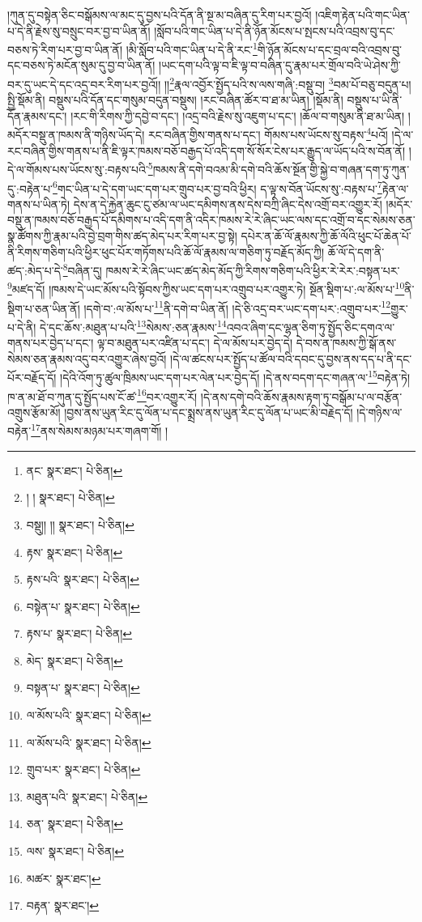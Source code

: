 །ཀུན་དུ་བསྟེན་ཅིང་བསྒོམས་ལ་མང་དུ་བྱས་པའི་དོན་ནི་སྔ་མ་བཞིན་དུ་རིག་པར་བྱའོ། །འཇིག་རྟེན་པའི་གང་ཡིན་པ་དེ་ནི་རྗེས་སུ་བསྲུང་བར་བྱ་བ་ཡིན་ནོ། །སློབ་པའི་གང་ཡིན་པ་དེ་ནི་ཉོན་མོངས་པ་སྤངས་པའི་འབྲས་བུ་དང་བཅས་ཏེ་རིག་པར་བྱ་བ་ཡིན་ནོ། །མི་སློབ་པའི་གང་ཡིན་པ་དེ་ནི་རང་\footnote{ནང་  སྣར་ཐང་།  པེ་ཅིན། }གི་ཉོན་མོངས་པ་དང་བྲལ་བའི་འབྲས་བུ་དང་བཅས་ཏེ་མངོན་སུམ་དུ་བྱ་བ་ཡིན་ནོ། །ཡང་དག་པའི་ལྟ་བ་ཇི་ལྟ་བ་བཞིན་དུ་རྣམ་པར་གྲོལ་བའི་ཡེ་ཤེས་ཀྱི་བར་དུ་ཡང་དེ་དང་འདྲ་བར་རིག་པར་བྱའོ།། །།\footnote{། །  སྣར་ཐང་།  པེ་ཅིན། }རྣལ་འབྱོར་སྤྱོད་པའི་ས་ལས་གཞི་:བསྡུ་བ། \footnote{བསྡུ།། །།   སྣར་ཐང་།  པེ་ཅིན། }བམ་པོ་བཅུ་བདུན་པ། སྤྱི་སྡོམ་ནི། བསྡུས་པའི་དོན་དང་གསུམ་བདུན་བསྡུས། །རང་བཞིན་ཚོར་བ་ཐ་མ་ཡིན། །སྡོམ་ནི། བསྡུས་པ་ཡི་ནི་དོན་རྣམས་དང་། །རང་གི་རིགས་ཀྱི་དབྱེ་བ་དང་། །འདྲ་བའི་རྗེས་སུ་འཇུག་པ་དང་། །ཆོལ་བ་གསུམ་ནི་ཐ་མ་ཡིན། །མདོར་བསྡུ་ན་ཁམས་ནི་གཉིས་ཡོད་དེ། རང་བཞིན་གྱིས་གནས་པ་དང་། གོམས་པས་ཡོངས་སུ་བརྟས་\footnote{རྟས་  སྣར་ཐང་།  པེ་ཅིན། }པའོ། །དེ་ལ་རང་བཞིན་གྱིས་གནས་པ་ནི་ཇི་ལྟར་ཁམས་བཅོ་བརྒྱད་པོ་འདི་དག་སོ་སོར་ངེས་པར་རྒྱུད་ལ་ཡོད་པའི་ས་བོན་ནོ། །དེ་ལ་གོམས་པས་ཡོངས་སུ་:བརྟས་པའི་\footnote{རྟས་པའི་  སྣར་ཐང་།  པེ་ཅིན། }ཁམས་ནི་དགེ་བའམ་མི་དགེ་བའི་ཆོས་སྔོན་གྱི་སྐྱེ་བ་གཞན་དག་ཏུ་ཀུན་དུ་:བརྟེན་པ་\footnote{བསྟེན་པ་  སྣར་ཐང་།  པེ་ཅིན། }གང་ཡིན་པ་དེ་དག་ཡང་དག་པར་གྲུབ་པར་བྱ་བའི་ཕྱིར། ད་ལྟ་ས་བོན་ཡོངས་སུ་:བརྟས་པ་\footnote{རྟས་པ་  སྣར་ཐང་།  པེ་ཅིན། }རྟེན་ལ་གནས་པ་ཡིན་ཏེ། དེས་ན་དེ་རྐྱེན་ཆུང་ངུ་ཙམ་ལ་ཡང་དམིགས་ནས་དེས་བཀྲི་ཞིང་དེས་འགྲོ་བར་འགྱུར་རོ། །མདོར་བསྡུ་ན་ཁམས་བཅོ་བརྒྱད་པོ་དམིགས་པ་འདི་དག་ནི་འདིར་ཁམས་རེ་རེ་ཞིང་ཡང་ལས་དང་འགྲོ་བ་དང་སེམས་ཅན་སྣ་ཚོགས་ཀྱི་རྣམ་པའི་བྱེ་བྲག་གིས་ཚད་མེད་པར་རིག་པར་བྱ་སྟེ། དཔེར་ན་ཆོ་ལོ་རྣམས་ཀྱི་ཆོ་ལོའི་ཕུང་པོ་ཆེན་པོ་ནི་རིགས་གཅིག་པའི་ཕྱིར་ཕུང་པོར་གཏོགས་པའི་ཆོ་ལོ་རྣམས་ལ་གཅིག་ཏུ་བརྗོད་མོད་ཀྱི། ཆོ་ལོ་དེ་དག་ནི་ཚད་:མེད་པ་དེ་\footnote{མེད་  སྣར་ཐང་།  པེ་ཅིན། }བཞིན་དུ། ཁམས་རེ་རེ་ཞིང་ཡང་ཚད་མེད་མོད་ཀྱི་རིགས་གཅིག་པའི་ཕྱིར་རེ་རེར་:བསྟན་པར་\footnote{བསྟན་པ་  སྣར་ཐང་།  པེ་ཅིན། }མཛད་དོ། །ཁམས་དེ་ཡང་མོས་པའི་སྟོབས་ཀྱིས་ཡང་དག་པར་འགྲུབ་པར་འགྱུར་ཏེ། སྔོན་སྡིག་པ་:ལ་མོས་པ་\footnote{ལ་མོས་པའི་  སྣར་ཐང་།  པེ་ཅིན། }ནི་སྡིག་པ་ཅན་ཡིན་ནོ། །དགེ་བ་:ལ་མོས་པ་\footnote{ལ་མོས་པའི་  སྣར་ཐང་།  པེ་ཅིན། }ནི་དགེ་བ་ཡིན་ནོ། །དེ་ཅི་འདྲ་བར་ཡང་དག་པར་:འགྲུབ་པར་\footnote{གྲུབ་པར་  སྣར་ཐང་།  པེ་ཅིན། }གྱུར་པ་དེ་ནི། དེ་དང་ཆོས་:མཐུན་པ་པའི་\footnote{མཐུན་པའི་  སྣར་ཐང་།  པེ་ཅིན། }སེམས་:ཅན་རྣམས་\footnote{ཅན་  སྣར་ཐང་།  པེ་ཅིན། }འབའ་ཞིག་དང་ལྷན་ཅིག་ཏུ་སྤྱོད་ཅིང་དགའ་ལ་གནས་པར་བྱེད་པ་དང་། ལྟ་བ་མཐུན་པར་འཛིན་པ་དང་། དེ་ལ་མོས་པར་བྱེད་དེ། དེ་བས་ན་ཁམས་ཀྱི་སྒོ་ནས་སེམས་ཅན་རྣམས་འདུ་བར་འགྱུར་ཞེས་བྱའོ། །དེ་ལ་ཚངས་པར་སྤྱོད་པ་ཚོལ་བའི་དབང་དུ་བྱས་ནས་དད་པ་ནི་དང་པོར་བརྗོད་དོ། །དེའི་འོག་ཏུ་ཚུལ་ཁྲིམས་ཡང་དག་པར་ལེན་པར་བྱེད་དོ། །དེ་ནས་བདག་དང་གཞན་ལ་\footnote{ལས་  སྣར་ཐང་།  པེ་ཅིན། }བརྟེན་ཏེ། ཁ་ན་མ་ཐོ་བ་ཀུན་དུ་སྤྱོད་པས་ངོ་ཚ་\footnote{མཚར་  སྣར་ཐང་། }བར་འགྱུར་རོ། །དེ་ནས་དགེ་བའི་ཆོས་རྣམས་རྟག་ཏུ་བསྒོམ་པ་ལ་བརྩོན་འགྲུས་རྩོམ་མོ། །བྱས་ནས་ཡུན་རིང་དུ་ལོན་པ་དང་སྨྲས་ནས་ཡུན་རིང་དུ་ལོན་པ་ཡང་མི་བརྗེད་དོ། །དེ་གཉིས་ལ་བརྟེན་\footnote{བརྟན་  སྣར་ཐང་། }ནས་སེམས་མཉམ་པར་གཞག་གོ། །
